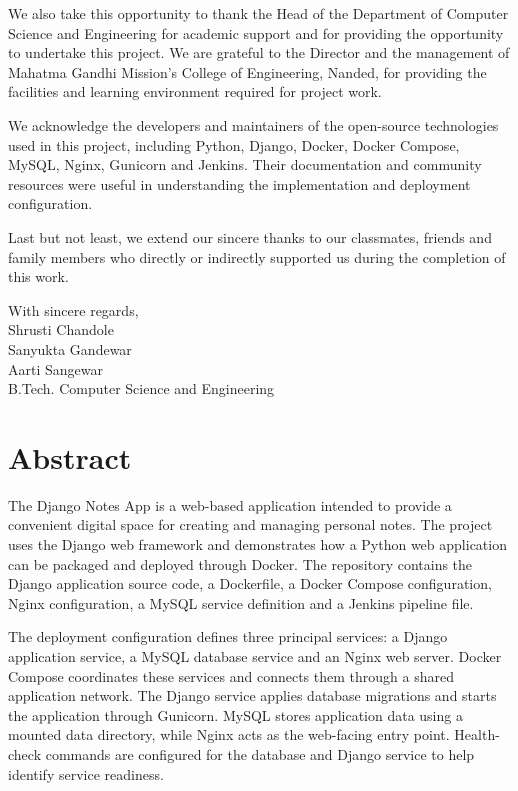 \documentclass[12pt,a4paper,oneside]{report}
\begin{document}
We also take this opportunity to thank the Head of the Department of Computer Science and Engineering for academic support and for providing the opportunity to undertake this project. We are grateful to the Director and the management of Mahatma Gandhi Mission's College of Engineering, Nanded, for providing the facilities and learning environment required for project work.

We acknowledge the developers and maintainers of the open-source technologies used in this project, including Python, Django, Docker, Docker Compose, MySQL, Nginx, Gunicorn and Jenkins. Their documentation and community resources were useful in understanding the implementation and deployment configuration.

Last but not least, we extend our sincere thanks to our classmates, friends and family members who directly or indirectly supported us during the completion of this work.

\vspace{0.35in}
\begin{flushright}
With sincere regards,\\[0.15in]
Shrusti Chandole\\
Sanyukta Gandewar\\
Aarti Sangewar\\
B.Tech. Computer Science and Engineering
\end{flushright}

\clearpage
\chapter*{Abstract}
The Django Notes App is a web-based application intended to provide a convenient digital space for creating and managing personal notes. The project uses the Django web framework and demonstrates how a Python web application can be packaged and deployed through Docker. The repository contains the Django application source code, a Dockerfile, a Docker Compose configuration, Nginx configuration, a MySQL service definition and a Jenkins pipeline file.

The deployment configuration defines three principal services: a Django application service, a MySQL database service and an Nginx web server. Docker Compose coordinates these services and connects them through a shared application network. The Django service applies database migrations and starts the application through Gunicorn. MySQL stores application data using a mounted data directory, while Nginx acts as the web-facing entry point. Health-check commands are configured for the database and Django service to help identify service readiness.
\end{document}
